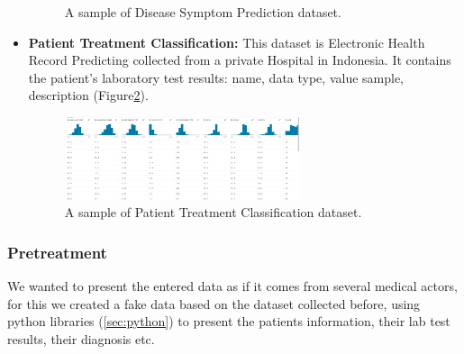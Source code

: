 \begin{itemize}
\begin{figure}[h!]
    \caption{A sample of Disease Symptom Prediction dataset.}
    \label{fig:simptoms}
  \end{figure}
  \item \textbf{Patient Treatment Classification:} This dataset is Electronic Health Record Predicting collected from a private Hospital in Indonesia. It contains the patient's laboratory test results: name, data type, value sample, description (Figure\ref{fig:treat}).
  \begin{figure}[h!]
    \center
    \includegraphics[width=0.65\textwidth]{images/chapter3/dataset/treat.PNG}
    \caption{A sample of Patient Treatment Classification dataset.}
    \label{fig:treat}
  \end{figure}
  
  \end{itemize}
  
\subsubsection*{Pretreatment}
We wanted to present the entered data as if it comes from several medical actors, for this we created a fake data based on the dataset collected before, using python libraries (\ref{sec:python}) to present the patients information, their lab test results, their diagnosis etc.


